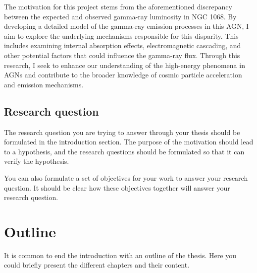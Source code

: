 The motivation for this project stems from the aforementioned discrepancy between the expected and observed gamma-ray luminosity in NGC 1068. By developing a detailed model of the gamma-ray emission processes in this AGN, I aim to explore the underlying mechanisms responsible for this disparity. This includes examining internal absorption effects, electromagnetic cascading, and other potential factors that could influence the gamma-ray flux. Through this research, I seek to enhance our understanding of the high-energy phenomena in AGNs and contribute to the broader knowledge of cosmic particle acceleration and emission mechanisms.

\subsection{Research question}

The research question you are trying to answer through your thesis should be formulated in the introduction section. The purpose of the motivation should lead to a hypothesis, and the research questions should be formulated so that it can verify the hypothesis.

You can also formulate a set of objectives for your work to answer your research question.  It should be clear how these objectives together will answer your research question.

\section{Outline}

It is common to end the introduction with an outline of the thesis. Here you could briefly present the different chapters and their content.